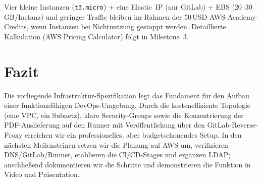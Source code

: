 \documentclass[a4paper,12pt]{article}
\begin{document}
Vier kleine Instanzen (\texttt{t3.micro}) + eine Elastic~IP (nur GitLab) + EBS (20–30\,GB/Instanz)
und geringer Traffic bleiben im Rahmen der 50\,USD AWS-Academy-Credits, wenn Instanzen
bei Nichtnutzung gestoppt werden. Detaillierte Kalkulation (AWS Pricing Calculator)
folgt in Milestone~3.

\section*{Fazit}
Die vorliegende Infrastruktur-Spezifikation legt das Fundament für den
Aufbau einer funktionsfähigen DevOps-Umgebung. Durch die kosteneffiziente
Topologie (eine VPC, ein Subnetz), klare Security-Groups sowie die
Konzentrierung der PDF-Auslieferung auf den Runner mit Veröffentlichung
über den GitLab-Reverse-Proxy erreichen wir ein professionelles, aber
budgetschonendes Setup. In den nächsten Meilensteinen setzen wir die
Planung auf AWS um, verifizieren DNS/GitLab/Runner, etablieren die
CI/CD-Stages und ergänzen LDAP; anschließend dokumentieren wir die
Schritte und demonstrieren die Funktion in Video und Präsentation.
\end{document}
